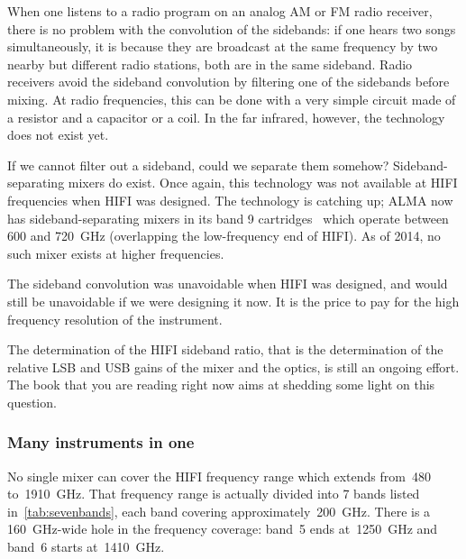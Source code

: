 When one listens to a radio program on an analog AM or FM radio receiver, there is no problem with the convolution of the sidebands: if one hears two songs simultaneously, it is because they are broadcast at the same frequency by two nearby but different radio stations, both are in the same sideband.
Radio receivers avoid the sideband convolution by filtering one of the sidebands before mixing.
At radio frequencies, this can be done with a very simple circuit made of a resistor and a capacitor or a coil.
In the far infrared, however, the technology does not exist yet.

If we cannot filter out a sideband, could we separate them somehow?
Sideband-separating mixers do exist.
Once again, this technology was not available at HIFI frequencies when HIFI was designed.
The technology is catching up; ALMA now has sideband-separating mixers in its band 9 cartridges~\cite{mena2007} which operate between \num{600} and \SI{720}{\giga\hertz} (overlapping the low-frequency end of HIFI).
As of 2014, no such mixer exists at higher frequencies.

The sideband convolution was unavoidable when HIFI was designed, and would still be unavoidable if we were designing it now.
It is the price to pay for the high frequency resolution of the instrument.

The determination of the HIFI sideband ratio,
that is the determination of the relative LSB and USB gains of the mixer and the optics,
is still an ongoing effort.
The book that you are reading right now aims at shedding some light on this question.




\subsubsection{Many instruments in one}
\label{sec:many_instruments_in_one}

No single mixer can cover the HIFI frequency range which extends from~\num{480} to~\SI{1910}{\giga\hertz}.
That frequency range is actually divided into 7 bands listed in~\cref{tab:sevenbands},
each band covering approximately~\SI{200}{\giga\hertz}.
There is a \SI{160}{\giga\hertz}-wide hole in the frequency coverage: band~5 ends at~\SI{1250}{\giga\hertz} and band~6 starts at~\SI{1410}{\giga\hertz}.

